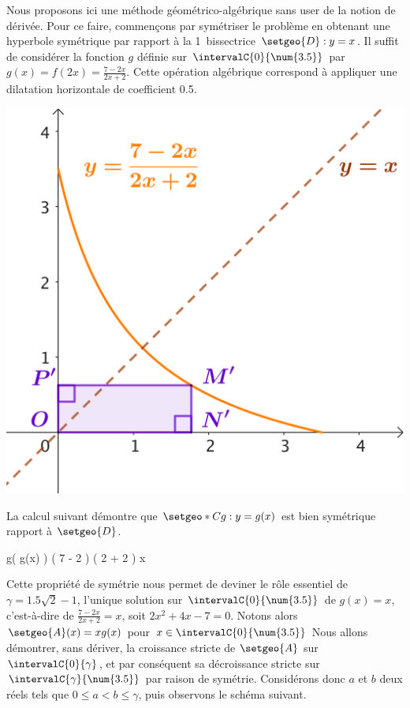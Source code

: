 Nous proposons ici une méthode géométrico-algébrique sans user de la notion de dérivée.
%
Pour ce faire, commençons par symétriser le problème en obtenant une hyperbole symétrique par rapport à la 1\iere\ bissectrice $\setgeo{D}: y = x$.
Il suffit de considérer la fonction $g$ définie sur $\intervalC{0}{\num{3.5}}$ par $g(x) = f(2x) = \frac{7-2x}{2x+2}$. Cette opération algébrique correspond à appliquer une dilatation horizontale de coefficient \num{.5}.

\smallskip

\begin{center}
	\includegraphics[scale=.67]{symmetric-goal.png}
\end{center}

La calcul suivant démontre que $\setgeo*{C}{g}: y = g(x)$ est bien symétrique rapport à $\setgeo{D}$.

\begin{stepcalc}[style=sar]
	g\big( g(x) \big)
\explnext{}
	     \Big( 7 - 2 \cdot {} \Big)
	\div \Big( 2 \cdot {} + 2 \Big)
\explnext{}
\explnext{}
\explnext{}
	x
\end{stepcalc}

Cette propriété de symétrie nous permet de deviner le rôle essentiel de
$\gamma = \num{1.5} \sqrt{2} - 1$, %
l'unique solution sur $\intervalC{0}{\num{3.5}}$ de 
$g(x) = x$,
c'est-à-dire de 
$\frac{7-2x}{2x+2} = x$,
soit
$2 x^2 + 4 x - 7 = 0$.
%
Notons alors $\setgeo{A}(x) = x g(x)$ pour $x \in \intervalC{0}{\num{3.5}}$
Nous allons démontrer, sans dériver, la croissance stricte de $\setgeo{A}$ sur $\intervalC{0}{\gamma}$, et par conséquent sa décroissance stricte sur $\intervalC{\gamma}{\num{3.5}}$ par raison de symétrie.
%
Considérons donc $a$ et $b$ deux réels tels que $0 \leq a < b \leq \gamma$, puis observons le schéma suivant.

